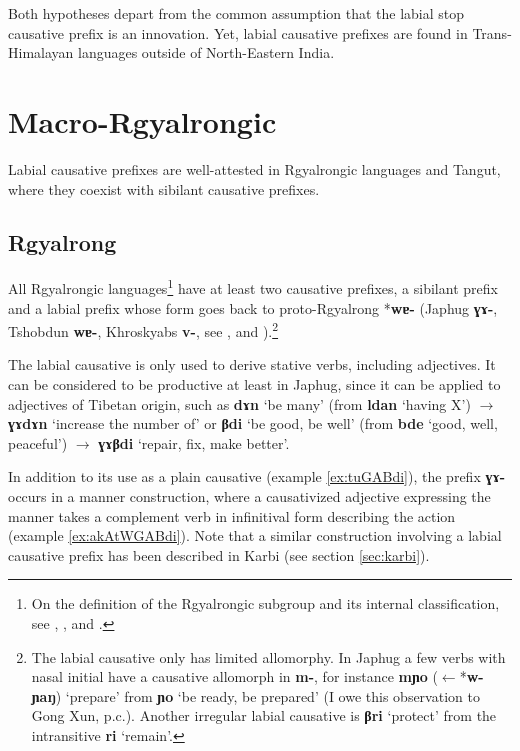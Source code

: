 \documentclass[oneside,a4paper,11pt]{article}
\newcommand{\ipa}[1]{\textbf{{\phon\mbox{#1}}}} %
\newcommand{\forme}[2]{\ipa{#1} `#2'}
\begin{document}
Both hypotheses depart from the common assumption that the labial stop causative prefix is an innovation. Yet, labial causative prefixes are found in Trans-Himalayan languages outside of North-Eastern India. 

\section{Macro-Rgyalrongic}
Labial causative prefixes are well-attested in Rgyalrongic languages and Tangut, where they coexist with sibilant causative prefixes.

\subsection{Rgyalrong} \label{sec:japhug}
All Rgyalrongic languages\footnote{On the definition of the Rgyalrongic subgroup and its internal classification, see \citet{jackson00sidaba}, \citet{jackson00puxi}, \citet{jacques14esquisse} and \citet{lai15person}.} have at least two causative prefixes, a sibilant prefix and a labial prefix whose form goes back to proto-Rgyalrong *\ipa{wɐ-} (Japhug \ipa{ɣɤ-}, Tshobdun \ipa{wɐ-}, Khroskyabs \ipa{v-}, see \citealt[322]{jacques04these}, \citealt{jackson06paisheng} and \citealt[136]{lai13affixale}).\footnote{The labial causative only has limited allomorphy. In Japhug a few verbs with nasal initial have a causative allomorph in \ipa{m-}, for instance \ipa{mɲo} ($\leftarrow$*\ipa{w-ɲaŋ}) `prepare' from \forme{ɲo}{be ready, be prepared} (I owe this observation to Gong Xun, p.c.). Another irregular labial causative is \ipa{βri} `protect' from the intransitive \ipa{ri} `remain'.}

The labial causative is only used to derive stative verbs, including adjectives. It can be considered to be  productive at least in Japhug, since it can be applied to adjectives of Tibetan origin, such as \forme{dɤn}{be many} (from \forme{ldan}{having X}) $\rightarrow$ \forme{ɣɤdɤn}{increase the number of} or \forme{βdi}{be good, be well} (from \forme{bde}{good, well, peaceful}) $\rightarrow$ \forme{ɣɤβdi}{repair, fix, make better}.

In addition to its use as a plain causative (example \ref{ex:tuGABdi}), the prefix \ipa{ɣɤ-} occurs in a manner construction, where a causativized adjective expressing the manner takes a complement verb in infinitival form describing the action (example \ref{ex:akAtWGABdi}). Note that a similar construction involving a labial causative prefix has been described in Karbi (see section \ref{sec:karbi}).
\end{document}
